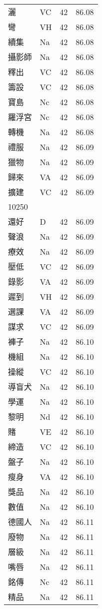 \documentclass[twocolumn]{book}
\begin{document}
\begin{supertabular}{llrr}
灑 & VC & 42 &  86.08\\
彎 & VH & 42 &  86.08\\
續集 & Na & 42 &  86.08\\
攝影師 & Na & 42 &  86.08\\
釋出 & VC & 42 &  86.08\\
籌設 & VC & 42 &  86.08\\
寶島 & Nc & 42 &  86.08\\
羅浮宮 & Nc & 42 &  86.08\\
轉機 & Na & 42 &  86.08\\
禮服 & Na & 42 &  86.09\\
獵物 & Na & 42 &  86.09\\
歸來 & VA & 42 &  86.09\\
擴建 & VC & 42 &  86.09\\
10250\\
還好 & D & 42 &  86.09\\
聲浪 & Na & 42 &  86.09\\
療效 & Na & 42 &  86.09\\
壓低 & VC & 42 &  86.09\\
錄影 & VA & 42 &  86.09\\
遲到 & VH & 42 &  86.09\\
選課 & VA & 42 &  86.09\\
謀求 & VC & 42 &  86.09\\
褲子 & Na & 42 &  86.10\\
機組 & Na & 42 &  86.10\\
操縱 & VC & 42 &  86.10\\
導盲犬 & Na & 42 &  86.10\\
學運 & Na & 42 &  86.10\\
黎明 & Nd & 42 &  86.10\\
賭 & VE & 42 &  86.10\\
締造 & VC & 42 &  86.10\\
盤子 & Na & 42 &  86.10\\
瘦身 & VA & 42 &  86.10\\
獎品 & Na & 42 &  86.10\\
數值 & Na & 42 &  86.10\\
德國人 & Na & 42 &  86.11\\
廢物 & Na & 42 &  86.11\\
層級 & Na & 42 &  86.11\\
嘴唇 & Na & 42 &  86.11\\
銘傳 & Nc & 42 &  86.11\\
精品 & Na & 42 &  86.11\\

\end{supertabular}
\end{document}
